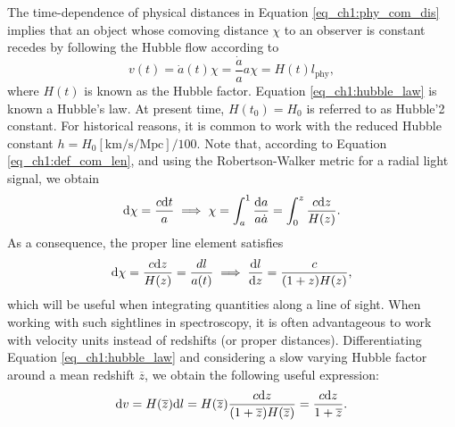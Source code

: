The time-dependence of physical distances in Equation \ref{eq_ch1:phy_com_dis} implies that an object whose comoving distance $\chi$ to an observer is constant recedes by following the Hubble flow according to
\begin{equation}\label{eq_ch1:hubble_law}
    v(t)=\dot{a}(t)\chi=\frac{\dot{a}}{a}a\chi=H(t)l_\text{phy},
\end{equation}
where $H(t)$ is known as the Hubble factor. Equation \ref{eq_ch1:hubble_law} is known a Hubble's law. At present time, $H(t_0)=H_0$ is referred to as Hubble'2 constant. For historical reasons, it is common to work with the reduced Hubble constant $h=H_0 [\text{km/s/Mpc}]/100$.
Note that, according to Equation \ref{eq_ch1:def_com_len}, and using the Robertson-Walker metric for a radial light signal, we obtain
\begin{equation}
    \differential \chi=\frac{c\differential t}{a}\implies \chi=\int_a^1\frac{\differential a}{a \dot{a}}=\int_0^z\frac{c \differential z}{H(z)}.
\end{equation}
As a consequence, the proper line element satisfies
\begin{equation}\label{eq_ch1:dl_over_dz}
    \differential \chi =\frac{c\differential z}{H(z)}=\frac{dl}{a(t)} \implies \frac{\differential l}{\differential z}=\frac{c}{(1+z)H(z)},
\end{equation}
which will be useful when integrating quantities along a line of sight. When working with such sightlines in spectroscopy, it is often advantageous to work with velocity units instead of redshifts (or proper distances). Differentiating Equation \ref{eq_ch1:hubble_law} and considering a slow varying Hubble factor around a mean redshift $\overline{z}$, we obtain the following useful expression:
\begin{equation}
    \differential v=H(\overline{z})\differential l=H(\overline{z})\frac{c\differential z}{(1+\overline{z})H(\overline{z})}=\frac{c\differential z}{1+\overline{z}}.
\end{equation}


